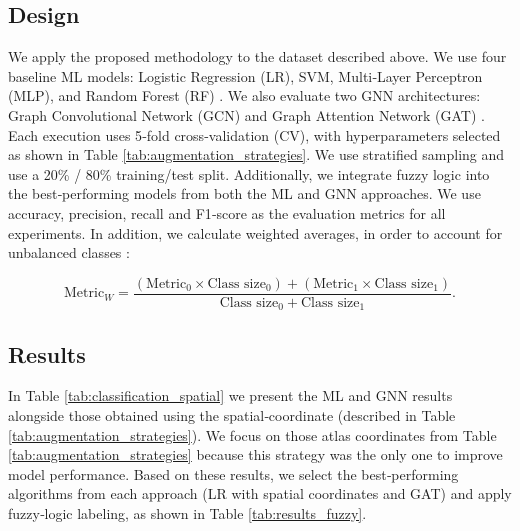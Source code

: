 \documentclass[doubleblind]{ecai}
\begin{document}
\subsection{Design}

We apply the proposed methodology to the dataset described above. We use four baseline ML models: Logistic Regression (LR), SVM, Multi‑Layer Perceptron (MLP), and Random Forest (RF) \cite{mohamed2023hybrid}. We also evaluate two GNN architectures: Graph Convolutional Network (GCN) and Graph Attention Network (GAT) \cite{zhang2019graph, velivckovic2017graph}. Each execution uses 5‑fold cross-validation (CV), with hyperparameters selected as shown in Table \ref{tab:augmentation_strategies}. We  use stratified sampling and use a 20\% / 80\% training/test split. Additionally, we integrate fuzzy logic into the best‑performing models from both the ML and GNN approaches. We use accuracy, precision, recall and F1‑score as the evaluation metrics for all experiments.
In addition, we calculate weighted averages, in order to account for unbalanced classes \cite{sokolova2009systematic}:

\begin{equation}
  \text{Metric}_{W} = \frac{(\text{Metric}_{0} \times \text{Class size}_{0}) + (\text{Metric}_{1} \times \text{Class size}_{1})}{\text{Class size}_{0} + \text{Class size}_{1}}.
\end{equation}


\subsection{Results}
In Table \ref{tab:classification_spatial} we present the ML and GNN results alongside those obtained using the spatial‑coordinate (described in Table \ref{tab:augmentation_strategies}). We focus on those atlas coordinates from Table \ref{tab:augmentation_strategies} because this strategy was the only one to improve model performance. Based on these results, we select the best‑performing algorithms from each approach (LR with spatial coordinates and GAT) and apply fuzzy‑logic labeling, as shown in Table \ref{tab:results_fuzzy}.
\end{document}

